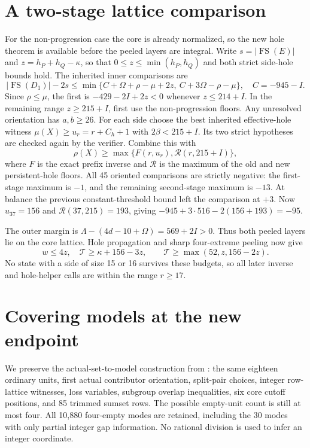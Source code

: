\documentclass[11pt,a4paper]{article}
\newcommand{\FS}{\operatorname{FS}}
\newcommand{\T}{\mathcal T}
\begin{document}
\section{A two-stage lattice comparison}
For the non-progression case the core is already normalized, so the
new hole theorem is available before the peeled layers are integral.
Write $s=|\FS(E)|$ and $z=h_P+h_Q-\kappa$, so that
$0\le z\le\min(h_P,h_Q)$ and both strict side-hole bounds hold.
The inherited inner comparisons are
\begin{equation}\label{inner}
 |\FS(D_1)|-2s\le
 \min\{C+\Omega+\rho-\mu+2z,\ C+3\Omega-\rho-\mu\},
 \quad C=-945-I.
\end{equation}
Since $\rho\le\mu$, the first is $-429-2I+2z<0$ whenever
$z\le214+I$. In the remaining range $z\ge215+I$, first use the
non-progression floors. Any unresolved orientation has $a,b\ge26$.
For each side choose the best inherited effective-hole witness
$\mu(X)\ge u_r=r+C_h+1$ with $2\beta<215+I$.
Its two strict hypotheses are checked again by the verifier.
Combine this with
\[
 \rho(X)\ge\max\{F(r,u_r),\mathcal R(r,215+I)\},
\]
where $F$ is the exact prefix inverse \cite{prefix} and
$\mathcal R$ is the maximum of the old and new persistent-hole floors.
All 45 oriented comparisons are strictly negative: the first-stage
maximum is $-1$, and the remaining second-stage maximum is $-13$.
At balance the previous constant-threshold bound left the comparison
at $+3$. Now $u_{37}=156$ and $\mathcal R(37,215)=193$, giving
$-945+3\cdot516-2(156+193)=-95$.

The outer margin is
$\Lambda-(4d-10+\Omega)=569+2I>0$.
Thus both peeled layers lie on the core lattice.
Hole propagation and sharp four-extreme peeling \cite{overlap} now give
\begin{equation}\label{peeling}
 w\le4z,\quad \T\ge\kappa+156-3z,\qquad
 \T\ge\max(52,z,156-2z).
\end{equation}
No state with a side of size 15 or 16 survives these budgets, so
all later inverse and hole-helper calls are within the range $r\ge17$.

\section{Covering models at the new endpoint}
We preserve the actual-set-to-model construction from \cite{previous}:
the same eighteen ordinary units, first actual contributor orientation,
split-pair choices, integer row-lattice witnesses, loss variables,
subgroup overlap inequalities, six core cutoff positions, and 85 trimmed
sumset rows. The possible empty-unit count is still at most four.
All 10,880 four-empty modes are retained, including the 30 modes with
only partial integer gap information. No rational division is used to
infer an integer coordinate.
\end{document}
